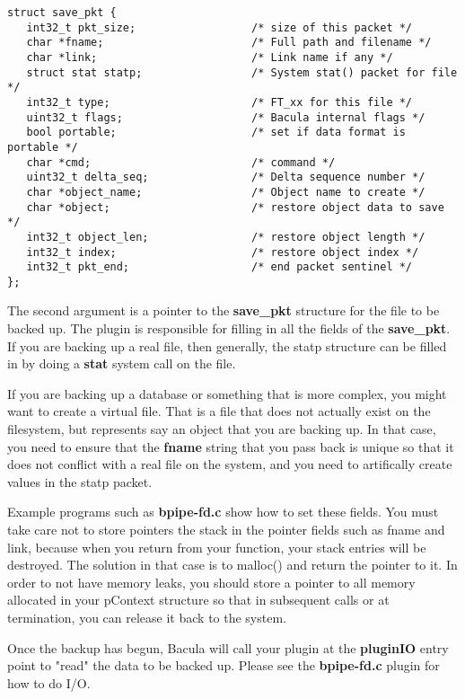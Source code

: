 \begin{verbatim}
struct save_pkt {
   int32_t pkt_size;                  /* size of this packet */
   char *fname;                       /* Full path and filename */
   char *link;                        /* Link name if any */
   struct stat statp;                 /* System stat() packet for file */
   int32_t type;                      /* FT_xx for this file */
   uint32_t flags;                    /* Bacula internal flags */
   bool portable;                     /* set if data format is portable */
   char *cmd;                         /* command */
   uint32_t delta_seq;                /* Delta sequence number */
   char *object_name;                 /* Object name to create */
   char *object;                      /* restore object data to save */
   int32_t object_len;                /* restore object length */
   int32_t index;                     /* restore object index */
   int32_t pkt_end;                   /* end packet sentinel */
};
\end{verbatim}

The second argument is a pointer to the {\bf save\_pkt} structure for the file
to be backed up.  The plugin is responsible for filling in all the fields 
of the {\bf save\_pkt}. If you are backing up
a real file, then generally, the statp structure can be filled in by doing
a {\bf stat} system call on the file.  

If you are backing up a database or
something that is more complex, you might want to create a virtual file.
That is a file that does not actually exist on the filesystem, but represents 
say an object that you are backing up.  In that case, you need to ensure
that the {\bf fname} string that you pass back is unique so that it
does not conflict with a real file on the system, and you need to 
artifically create values in the statp packet.

Example programs such as {\bf bpipe-fd.c} show how to set these fields.  You
must take care not to store pointers the stack in the pointer fields such as
fname and link, because when you return from your function, your stack entries
will be destroyed. The solution in that case is to malloc() and return the
pointer to it. In order to not have memory leaks, you should store a pointer to
all memory allocated in your pContext structure so that in subsequent calls or
at termination, you can release it back to the system.

Once the backup has begun, Bacula will call your plugin at the {\bf pluginIO}
entry point to "read" the data to be backed up.  Please see the {\bf bpipe-fd.c}
plugin for how to do I/O.

